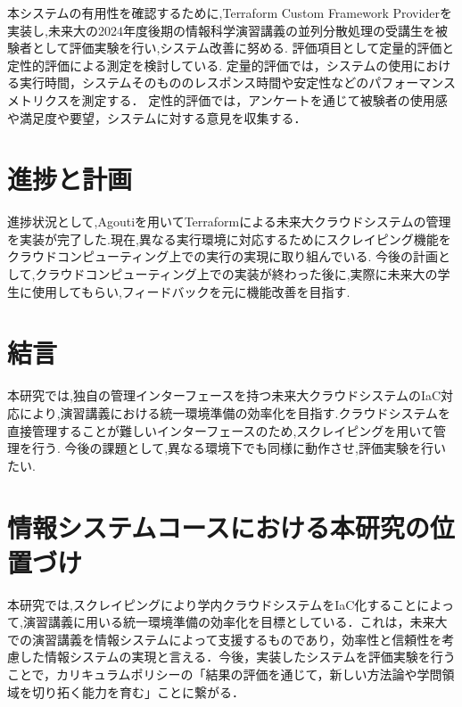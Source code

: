 \documentclass[11pt]{ujarticle}\sloppy
\begin{document}
本システムの有用性を確認するために,Terraform Custom Framework Providerを実装し,未来大の2024年度後期の情報科学演習講義の並列分散処理の受講生を被験者として評価実験を行い,システム改善に努める.
評価項目として定量的評価と定性的評価による測定を検討している.
定量的評価では，システムの使用における実行時間，システムそのもののレスポンス時間や安定性などのパフォーマンスメトリクスを測定する．
定性的評価では，アンケートを通じて被験者の使用感や満足度や要望，システムに対する意見を収集する．



\section{進捗と計画}

進捗状況として,Agoutiを用いてTerraformによる未来大クラウドシステムの管理を実装が完了した.現在,異なる実行環境に対応するためにスクレイピング機能をクラウドコンピューティング上での実行の実現に取り組んでいる.
今後の計画として,クラウドコンピューティング上での実装が終わった後に,実際に未来大の学生に使用してもらい,フィードバックを元に機能改善を目指す.


\section{結言}

本研究では,独自の管理インターフェースを持つ未来大クラウドシステムのIaC対応により,演習講義における統一環境準備の効率化を目指す.クラウドシステムを直接管理することが難しいインターフェースのため,スクレイピングを用いて管理を行う.
今後の課題として,異なる環境下でも同様に動作させ,評価実験を行いたい.


\section{情報システムコースにおける本研究の位置づけ}

本研究では,スクレイピングにより学内クラウドシステムをIaC化することによって,演習講義に用いる統一環境準備の効率化を目標としている．これは，未来大での演習講義を情報システムによって支援するものであり，効率性と信頼性を考慮した情報システムの実現と言える．今後，実装したシステムを評価実験を行うことで，カリキュラムポリシーの「結果の評価を通じて，新しい方法論や学問領域を切り拓く能力を育む」ことに繋がる．
\end{document}
